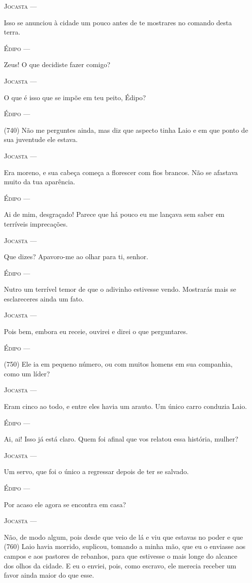 \textsc{Jocasta} ---

Isso se anunciou à cidade um pouco antes de te mostrares no comando
desta terra.

\textsc{Édipo} ---

Zeus! O que decidiste fazer comigo?

\textsc{Jocasta} ---

O que é isso que se impõe em teu peito, Édipo?

\textsc{Édipo} ---

(740) Não me perguntes ainda, mas diz que aspecto tinha Laio e em que
ponto de sua juventude ele estava.

\textsc{Jocasta} ---

Era moreno, e sua cabeça começa a florescer com fios brancos. Não se
afastava muito da tua aparência.

\textsc{Édipo} ---

Ai de mim, desgraçado! Parece que há pouco eu me lançava sem saber em
terríveis imprecações.

\textsc{Jocasta} ---

Que dizes? Apavoro-me ao olhar para ti, senhor.

\textsc{Édipo} ---

Nutro um terrível temor de que o adivinho estivesse vendo. Mostrarás
mais se esclareceres ainda um fato.

\textsc{Jocasta} ---

Pois bem, embora eu receie, ouvirei e direi o que perguntares.

\textsc{Édipo} ---

(750) Ele ia em pequeno número, ou com muitos homens em sua companhia,
como um líder?

\textsc{Jocasta} ---

Eram cinco ao todo, e entre eles havia um arauto. Um único carro
conduzia Laio.

\textsc{Édipo} ---

Ai, ai! Isso já está claro. Quem foi afinal que vos relatou essa
história, mulher?

\textsc{Jocasta} ---

Um servo, que foi o único a regressar depois de ter se salvado.

\textsc{Édipo} ---

Por acaso ele agora se encontra em casa?

\textsc{Jocasta} ---

Não, de modo algum, pois desde que veio de lá e viu que estavas no poder
e que (760) Laio havia morrido, suplicou, tomando a minha mão, que eu o
enviasse aos campos e aos pastores de rebanhos, para que estivesse o
mais longe do alcance dos olhos da cidade. E eu o enviei, pois, como
escravo, ele merecia receber um favor ainda maior do que esse.

